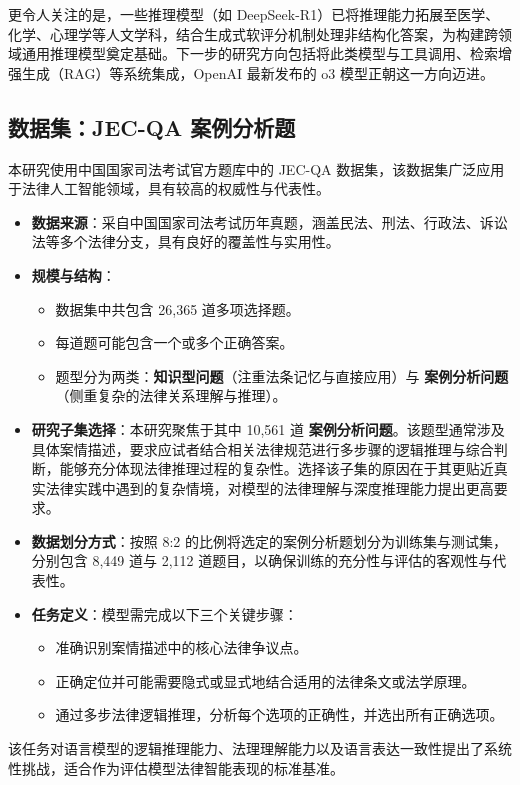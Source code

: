 \documentclass{article}
\newcommand{\deepseekr}{DeepSeek-R1}
\newcommand{\deepseekr}{DeepSeek-R1}
\begin{document}
更令人关注的是，一些推理模型（如 \deepseekr \cite{guo2025deepseek}）已将推理能力拓展至医学、化学、心理学等人文学科，结合生成式软评分机制处理非结构化答案，为构建跨领域通用推理模型奠定基础。下一步的研究方向包括将此类模型与工具调用、检索增强生成（RAG）等系统集成，OpenAI 最新发布的 o3 模型正朝这一方向迈进。

\subsection{数据集：JEC-QA 案例分析题}

本研究使用中国国家司法考试官方题库中的 JEC-QA 数据集\cite{zhong2020jec}，该数据集广泛应用于法律人工智能领域，具有较高的权威性与代表性。

\begin{itemize}
\item \textbf{数据来源}：采自中国国家司法考试历年真题，涵盖民法、刑法、行政法、诉讼法等多个法律分支，具有良好的覆盖性与实用性。
\item \textbf{规模与结构}：
\begin{itemize}
\item 数据集中共包含 26,365 道多项选择题。
\item 每道题可能包含一个或多个正确答案。
\item 题型分为两类：\textbf{知识型问题}（注重法条记忆与直接应用）与 \textbf{案例分析问题}（侧重复杂的法律关系理解与推理）。
\end{itemize}
\item \textbf{研究子集选择}：本研究聚焦于其中 10,561 道 \textbf{案例分析问题}。该题型通常涉及具体案情描述，要求应试者结合相关法律规范进行多步骤的逻辑推理与综合判断，能够充分体现法律推理过程的复杂性。选择该子集的原因在于其更贴近真实法律实践中遇到的复杂情境，对模型的法律理解与深度推理能力提出更高要求。
\item \textbf{数据划分方式}：按照 8:2 的比例将选定的案例分析题划分为训练集与测试集，分别包含 8,449 道与 2,112 道题目，以确保训练的充分性与评估的客观性与代表性。
\item \textbf{任务定义}：模型需完成以下三个关键步骤：
\begin{itemize}
\item 准确识别案情描述中的核心法律争议点。
\item 正确定位并可能需要隐式或显式地结合适用的法律条文或法学原理。
\item 通过多步法律逻辑推理，分析每个选项的正确性，并选出所有正确选项。
\end{itemize}
\end{itemize}
该任务对语言模型的逻辑推理能力、法理理解能力以及语言表达一致性提出了系统性挑战，适合作为评估模型法律智能表现的标准基准。
\end{document}
